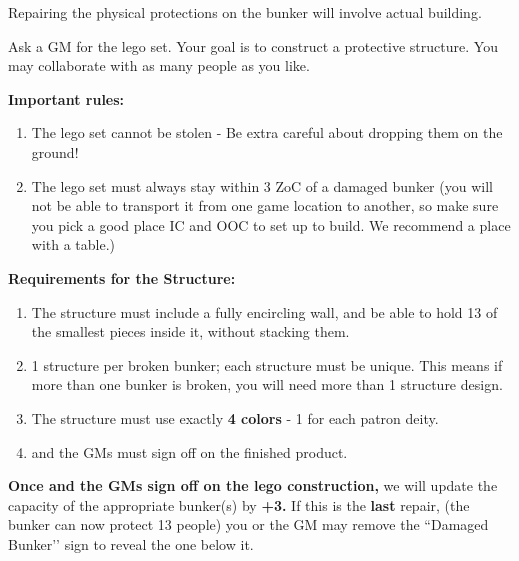 \documentclass[green]{GL2020}
\begin{document}
\name{\gPhysicalLayer{}}

Repairing the physical protections on the bunker will involve actual building.

Ask a GM for the lego set. Your goal is to construct a protective structure. You may collaborate with as many people as you like.

\textbf{Important rules:}
\begin{enumerate}
  \item The lego set cannot be stolen - Be extra careful about dropping them on the ground!
  \item The lego set must always stay within 3 ZoC of a damaged bunker (you will not be able to transport it from one game location to another, so make sure you pick a good place IC and OOC to set up to build. We recommend a place with a table.)
\end{enumerate}

\textbf{Requirements for the Structure:}
\begin{enumerate}
  \item The structure must include a fully encircling wall, and be able to hold 13 of the smallest pieces inside it, without stacking them.
  \item 1 structure per broken bunker; each structure must be unique. This means if more than one bunker is broken, you will need more than 1 structure design.
  \item The structure must use exactly \textbf{4 colors} - 1 for each patron deity.
  \item \cBunker{\full} and the GMs must sign off on the finished product.
\end{enumerate}

\textbf{Once \cBunker{} and the GMs sign off on the lego construction,} we will update the capacity of the appropriate bunker(s) by \textbf{+3.}  If this is the \textbf{last} repair, (the bunker can now protect 13 people) you or the GM may remove the ``Damaged Bunker’’ sign to reveal the one below it.
\end{document}
